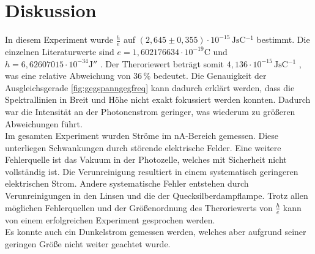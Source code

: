 \section{Diskussion}
\label{sec:Diskussion}

In diesem Experiment wurde $ \frac{h}{e}$ auf $(2,645 \pm 0,355) \cdot 10^{-15} \,\si{\joule\second\coulomb^{-1}}$ bestimmt.
Die einzelnen Literaturwerte sind $e = 1,602176634 \cdot 10^{-19} \unit{\coulomb} $ \cite{go02} und $h= 6,62607015 \cdot 10^{-34} \unit{\joule \mathbin{\second}}  $ \cite{go03}.
Der Theroriewert beträgt somit $4,136 \cdot 10^{-15} \,\si{\joule\second\coulomb^{-1}}$ , was eine relative Abweichung von $36 \, \%$ bedeutet. Die Genauigkeit der Ausgleichsgerade \autoref{fig:gegspanngegfreq} kann dadurch erklärt werden, dass die Spektrallinien in Breit und Höhe nicht exakt fokussiert werden konnten.
Dadurch war die Intensität an der Photonenstrom geringer, was wiederum zu größeren Abweichungen führt. \\

Im gesamten Experiment wurden Ströme im $\unit{\nano\ampere}$-Bereich gemessen. Diese unterliegen Schwankungen durch störende elektrische Felder.
Eine weitere Fehlerquelle ist das Vakuum in der Photozelle, welches mit Sicherheit nicht vollständig ist. Die Verunreinigung resultiert in einem systematisch geringeren elektrischen Strom.
Andere systematische Fehler entstehen durch Verunreinigungen in den Linsen und die der Quecksilberdampflampe. Trotz allen möglichen Fehlerquellen und der Größenordnung des Theroriewerts von $\frac{h}{e}$ kann von einem erfolgreichen Experiment gesprochen werden. \\
Es konnte auch ein Dunkelstrom gemessen werden, welches aber aufgrund seiner geringen Größe nicht weiter geachtet wurde.\\